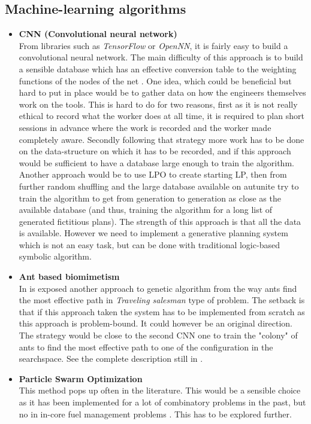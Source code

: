 \subsection{Machine-learning algorithms}
\begin{itemize}
    \item \textbf{CNN (Convolutional neural network)}\\
    From libraries such as \textit{TensorFlow} or \textit{OpenNN}, it is fairly easy to build a convolutional neural network. The main difficulty of this approach is to build a sensible database which has an effective conversion table to the weighting functions of the nodes of the net \cite{net}. One idea, which could be beneficial but hard to put in place would be to gather data on how the engineers themselves work on the tools. This is hard to do for two reasons, first as it is not really ethical to record what the worker does at all time, it is required to plan short sessions in advance where the work is recorded and the worker made completely aware. Secondly following that strategy more work has to be done on the data-structure on which it has to be recorded, and if this approach would be sufficient to have a database large enough to train the algorithm. \\
    
    Another approach would be to use LPO to create starting LP, then from further random shuffling and the large database available on autunite try to train the algorithm to get from generation to generation as close as the available database (and thus, training the algorithm for a long list of generated fictitious plans). The strength of this approach is that all the data is available. However we need to implement a generative planning system which is not an easy task, but can be done with traditional logic-based symbolic algorithm.
    
    \item \textbf{Ant based biomimetism} \\
    In \cite{ephraim19} is exposed another approach to genetic algorithm from the way ants find the most effective path in \textit{Traveling salesman} type of problem. The setback is that if this approach taken the system has to be implemented from scratch as this approach is problem-bound. It could however be an original direction. The strategy would be close to the second CNN one to train the "colony" of ants to find the most effective path to one of the configuration in the searchspace. See the complete description still in \cite{ephraim19}.
    
    \item \textbf{Particle Swarm Optimization} \\
    This method pops up often in the literature. This would be a sensible choice as it has been implemented for a lot of combinatory problems in the past, but no in in-core fuel management problems \cite{anderson19}. This has to be explored further.
\end{itemize}

